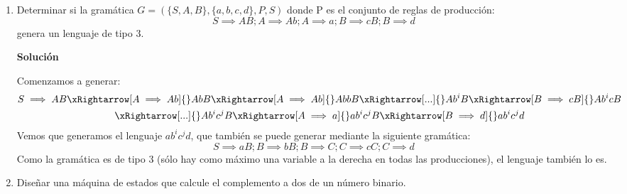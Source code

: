 \documentclass[12pt,spanish]{article}
\newenvironment{solution}{
	\par
	\textbf{Solución}
	\par
	\begin{center}
}
{
	\end{center}
}
\begin{document}
\begin{enumerate}
	\item Determinar si la gramática $G=(\{S,A,B\},\{a,b,c,d\},P,S)$ donde P es el conjunto de reglas de producción:
	\[
		S \implies AB ; A \implies Ab ; A \implies a ; B \implies cB ; B \implies d
	\]
	genera un lenguaje de tipo 3.
	\begin{solution}
		Comenzamos a generar:
		\begin{gather*}
			S \implies AB \xRightarrow[A \implies Ab]{} AbB \xRightarrow[A \implies Ab]{} AbbB \xRightarrow[...]{} Ab^iB \xRightarrow[B \implies cB]{} Ab^icB \\ \xRightarrow[...]{} Ab^ic^jB \xRightarrow[A \implies a]{} ab^ic^jB \xRightarrow[B \implies d]{} ab^ic^jd
		\end{gather*}
		Vemos que generamos el lenguaje ${ab^ic^jd}$, que también se puede generar mediante la siguiente gramática:
		\[
			S \implies aB ; B \implies bB ; B \implies C ; C \implies cC ; C \implies d
		\]
		Como la gramática es de tipo 3 (sólo hay como máximo una variable a la derecha en todas las producciones), el lenguaje también lo es.
	\end{solution}

	\item Diseñar una máquina de estados que calcule el complemento a dos de un número binario.


\end{enumerate}
\end{document}
